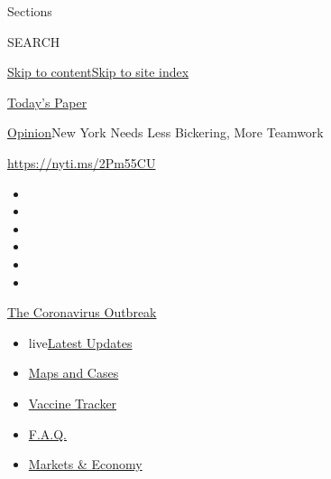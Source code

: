 Sections

SEARCH

\protect\hyperlink{site-content}{Skip to
content}\protect\hyperlink{site-index}{Skip to site index}

\href{https://myaccount.nytimes.com/auth/login?response_type=cookie\&client_id=vi}{}

\href{https://www.nytimes.com/section/todayspaper}{Today's Paper}

\href{/section/opinion}{Opinion}\textbar{}New York Needs Less Bickering,
More Teamwork

\href{https://nyti.ms/2Pm55CU}{https://nyti.ms/2Pm55CU}

\begin{itemize}
\item
\item
\item
\item
\item
\item
\end{itemize}

\href{https://www.nytimes.com/news-event/coronavirus?action=click\&pgtype=Article\&state=default\&region=TOP_BANNER\&context=storylines_menu}{The
Coronavirus Outbreak}

\begin{itemize}
\tightlist
\item
  live\href{https://www.nytimes.com/2020/08/08/world/coronavirus-updates.html?action=click\&pgtype=Article\&state=default\&region=TOP_BANNER\&context=storylines_menu}{Latest
  Updates}
\item
  \href{https://www.nytimes.com/interactive/2020/us/coronavirus-us-cases.html?action=click\&pgtype=Article\&state=default\&region=TOP_BANNER\&context=storylines_menu}{Maps
  and Cases}
\item
  \href{https://www.nytimes.com/interactive/2020/science/coronavirus-vaccine-tracker.html?action=click\&pgtype=Article\&state=default\&region=TOP_BANNER\&context=storylines_menu}{Vaccine
  Tracker}
\item
  \href{https://www.nytimes.com/interactive/2020/world/coronavirus-tips-advice.html?action=click\&pgtype=Article\&state=default\&region=TOP_BANNER\&context=storylines_menu}{F.A.Q.}
\item
  \href{https://www.nytimes.com/live/2020/08/07/business/stock-market-today-coronavirus?action=click\&pgtype=Article\&state=default\&region=TOP_BANNER\&context=storylines_menu}{Markets
  \& Economy}
\end{itemize}

